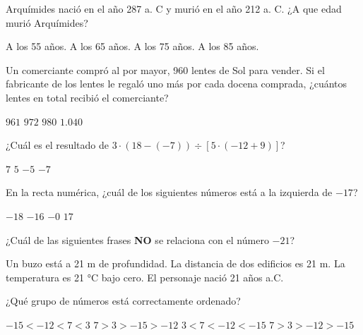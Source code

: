 \documentclass[spanish,letterpaper, 12pt, addpoints, answers]{exam}
\begin{document}
\begin{questions}
\newpage
    \question[1] Arquímides nació en el año 287 a. C y murió en el año 212 a. C. ¿A que edad murió Arquímides?
    \begin{choices}
        \choice A los 55 años.
        \choice A los 65 años.
        \CorrectChoice A los 75 años.
        \choice A los 85 años.
    \end{choices}
    \vspace{0.15in}

    \question[1] Un comerciante compró al por mayor, 960 lentes de Sol para vender. Si el fabricante de los lentes le regaló uno más por cada docena comprada, ¿cuántos lentes en total recibió el comerciante?
    \begin{choices}
        \choice $961$
        \choice $972$
        \choice $980$
        \CorrectChoice $1.040$
    \end{choices}
    \vspace{0.15in}

    \question[1] ¿Cuál es el resultado de $3\cdot (18-(-7))\div \left[5\cdot (-12+9)\right]$?
    \begin{choices}
        \choice $7$
        \choice $5$
        \CorrectChoice $-5$
        \choice $-7$
    \end{choices}
    \vspace{0.15in}

    \question[1] En la recta numérica, ¿cuál de los siguientes números está a la izquierda de $-17$?
    \begin{choices}
        \CorrectChoice $-18$
        \choice $-16$
        \choice $-0$
        \choice $17$
    \end{choices}
    \vspace{0.15in}

    \question[1] ¿Cuál de las siguientes frases \textbf{NO} se relaciona con el número $-21$?
    \begin{choices}
        \choice Un buzo está a 21 m de profundidad.
        \CorrectChoice La distancia de dos edificios es 21 m.
        \choice La temperatura es 21 °C bajo cero.
        \choice El personaje nació 21 años a.C.
    \end{choices}
    \vspace{0.15in}

\newpage
    \question[1] ¿Qué grupo de números está correctamente ordenado?
    \begin{choices}
        \choice $-15<-12<7<3$
        \choice $7>3>-15>-12$
        \choice $3<7<-12<-15$
        \CorrectChoice $7>3>-12>-15$
    \end{choices}
    \vspace{0.15in}


\end{questions}
\end{document}

